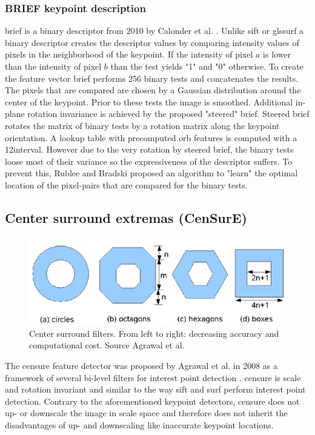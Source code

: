 \subsubsection*{BRIEF keypoint description}
\gls{brief} is a binary descriptor from 2010 by Calonder et al. \cite{Calonder2010}. Unlike \gls{sift} or gls{surf} a binary descriptor creates the descriptor values by comparing intensity values of pixels in the neighborhood of the keypoint. If the intensity of pixel $a$ is lower than the intensity of pixel $b$ than the test yields "1" and "0" otherwise. To create the feature vector \gls{brief}  performs 256 binary tests and concatenates the results. The pixels that are compared are chosen by a Gaussian distribution around the center of the keypoint. Prior to these tests the image is smoothed. Additional in-plane rotation invariance is achieved by the proposed "steered" \gls{brief}. Steered \gls{brief} rotates the matrix of binary tests by a rotation matrix along the keypoint orientation. A lookup table with precomputed \gls{orb} features is computed with a 12\degree interval. However due to the very rotation by steered \gls{brief}, the binary tests loose most of their variance so the expressiveness of the descriptor suffers. To prevent this, Rublee and Bradski proposed an algorithm to "learn" the optimal location of the pixel-pairs that are compared for the binary tests.

\subsection[CenSurE]{Center surround extremas (CenSurE)}
\begin{figure}
	\centering
	\includegraphics[scale=0.2]{figures/theoryCenSurE_filters}
	\caption{Center surround filters. From left to right: decreasing accuracy and computational cost.  Source Agrawal et al. \cite{Agrawal2008}}
	\label{fig:censureFilters}
\end{figure}
The \gls{censure} feature detector was proposed by Agrawal et al. in 2008 as a framework of several bi-level filters for interest point detection \cite{Agrawal2008}. \gls{censure} is scale and rotation invariant and similar to the way \gls{sift} and \gls{surf} perform interest point detection. Contrary to the aforementioned keypoint detectors, \gls{censure} does not up- or downscale the image in scale space and therefore does not inherit the disadvantages of up- and downscaling like inaccurate keypoint locations.

